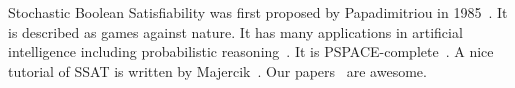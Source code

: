 Stochastic Boolean Satisfiability was first proposed by Papadimitriou in 1985~\cite{Papadimitriou1985}.
It is described as games against nature.
It has many applications in artificial intelligence including probabilistic reasoning~\cite{Majercik2003}.
It is PSPACE-complete~\cite{Stockmeyer1973}.
A nice tutorial of SSAT is written by Majercik~\cite{SATHandbook-SSAT}.
Our papers~\cite{LeeIJCAI17RESSAT,LeeIJCAI18ERSSAT} are awesome.